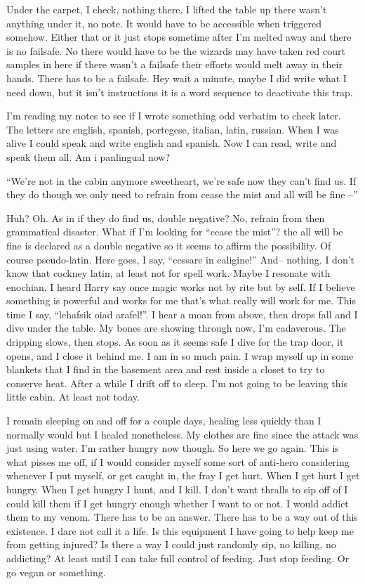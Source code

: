 Under the carpet, I check, nothing there. I lifted the table up there wasn't anything under it, no note. It would have to be accessible when triggered somehow. Either that or it just stops sometime after I'm melted away and there is no failsafe. No there would have to be the wizards may have taken red court samples in here if there wasn't a failsafe their efforts would melt away in their hands. There has to be a failsafe. Hey wait a minute, maybe I did write what I need down, but it isn't instructions it is a word sequence to deactivate this trap.

I'm reading my notes to see if I wrote something odd verbatim to check later. The letters are english, spanish, portegese, italian, latin, russian. When I was alive I could speak and write english and spanish. Now I can read, write and speak them all. Am i panlingual now?

``We're not in the cabin anymore sweetheart, we're safe now they can't find us. If they do though we only need to refrain from cease the mist and all will be fine --''

Huh? Oh. As in if they do find us, double negative? No, refrain from then grammatical disaster. What if I'm looking for ``cease the mist''? the all will be fine is declared as a double negative so it seems to affirm the possibility. Of course pseudo-latin. Here goes, I say, ``cessare in caligine!'' And-- nothing. I don't know that cockney latin, at least not for spell work. Maybe I resonate with enochian. I heard Harry say once magic works not by rite but by self. If I believe something is powerful and works for me that's what really will work for me. This time I say, ``lehafsik oiad arafel!''. I hear a moan from above, then drops fall and I dive under the table. My bones are showing through now, I'm cadaverous. The dripping slows, then stops. As soon as it seems safe I dive for the trap door, it opens, and I close it behind me. I am in so much pain. I wrap myself up in some blankets that I find in the basement area and rest inside a closet to try to conserve heat. After a while I drift off to sleep. I'm not going to be leaving this little cabin. At least not today.

I remain sleeping on and off for a couple days, healing less quickly than I normally would but I healed nonetheless. My clothes are fine since the attack was just using water. I'm rather hungry now though. So here we go again. This is what pisses me off, if I would consider myself some sort of anti-hero considering whenever I put myself, or get caught in, the fray I get hurt. When I get hurt I get hungry. When I get hungry I hunt, and I kill. I don't want thralls to sip off of I could kill them if I get hungry enough whether I want to or not. I would addict them to my venom. There has to be an answer. There has to be a way out of this existence. I dare not call it a life. Is this equipment I have going to help keep me from getting injured? Is there a way I could just randomly sip, no killing, no addicting? At least until I can take full control of feeding. Just stop feeding. Or go vegan or something.

